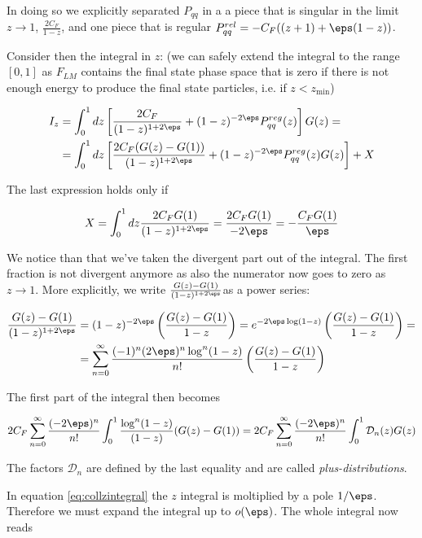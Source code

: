 \documentclass[11pt]{report}
\begin{document}
In doing so we explicitly separated \(P_{qq}\) in a a piece that is singular in the limit \(z\to1\), \(\frac{2C_F}{1-z}\), and one piece that is regular \(P^{rel}_{qq} = -C_F((z+1) + \eps(1-z))\). 

Consider then the integral in \(z\): (we can safely extend the integral to the range \([0, 1]\) as \(F_{LM}\) contains the final state phase space that is zero if there is not enough energy to produce the final state particles, i.e. if \(z<z_{\min}\))

\begin{align}
    I_z &= \int_0^1 dz \left[ \frac{2C_F}{(1-z)^{1+2\eps}}+(1-z)^{-2\eps}P_{qq}^{reg}(z) \right]G(z) = \notag \\ 
    &= \int_0^1 dz \left[ \frac{2C_F(G(z)-G(1))}{(1-z)^{1+2\eps}}+(1-z)^{-2\eps}P_{qq}^{reg}(z)G(z) \right] + X
\end{align}

The last expression holds only if 

\begin{align}
    X = \int_0^1 dz \frac{2C_FG(1)}{(1-z)^{1+2\eps}} = \frac{2C_FG(1)}{-2\eps} = -\frac{C_F G(1)}{\eps}
\end{align}

We notice than that we've taken the divergent part out of the integral. The first fraction is not divergent anymore as also the numerator now goes to zero as \(z\to1\). More explicitly, we write \(\frac{G(z)-G(1)}{(1-z)^{1+2\eps}}\)as a power series: 

\begin{align}
    \frac{G(z)-G(1)}{(1-z)^{1+2\eps}} &= (1-z)^{-2\eps}\left( \frac{G(z)-G(1)}{1-z} \right) = e^{-2\eps\log(1-z)}\left( \frac{G(z)-G(1)}{1-z} \right) = \notag \\ 
    &= \sum_{n=0}^{\infty} \frac{(-1)^n (2\eps)^n \log^n(1-z)}{n!}\left( \frac{G(z)-G(1)}{1-z} \right) 
\end{align}

The first part of the integral then becomes  

\begin{align}
    2C_F \sum_{n=0}^{\infty}\frac{(-2\eps)^n}{n!}\int_0^1 \frac{\log^n(1-z)}{(1-z)}(G(z)-G(1)) = 2C_F \sum_{n=0}^{\infty}\frac{(-2\eps)^n}{n!}\int_0^1 \mathcal{D}_n(z) G(z)  
\end{align}

The factors \(\mathcal{D}_n\) are defined by the last equality and are called \emph{plus-distributions}.

In equation \ref{eq:collzintegral} the \(z\) integral is moltiplied by a pole \(1/\eps\). Therefore we must expand the integral up to \(o(\eps)\). The whole integral now reads
\end{document}
